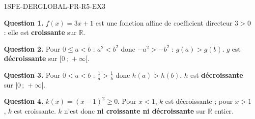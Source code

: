 \begin{corrige}{1SPE-DERGLOBAL-FR-R5-EX3}

\textbf{Question 1.}
$f(x) = 3x + 1$ est une fonction affine de coefficient directeur $3 > 0$ : elle est \textbf{croissante} sur $\mathbb{R}$.


\textbf{Question 2.}
Pour $0 \leqslant a < b$ : $a^2 < b^2$ donc $-a^2 > -b^2$ : $g(a) > g(b)$. $g$ est \textbf{décroissante} sur $[0\,;\,+\infty[$.

\textbf{Question 3.}
Pour $0 < a < b$ : $\frac{1}{a} > \frac{1}{b}$ donc $h(a) > h(b)$. $h$ est \textbf{décroissante} sur $]0\,;\,+\infty[$.

\textbf{Question 4.}
$k(x) = (x-1)^2 \geqslant 0$. Pour $x < 1$, $k$ est décroissante ; pour $x > 1$, $k$ est croissante. $k$ n'est donc \textbf{ni croissante ni décroissante} sur $\mathbb{R}$ entier.

\end{corrige}
